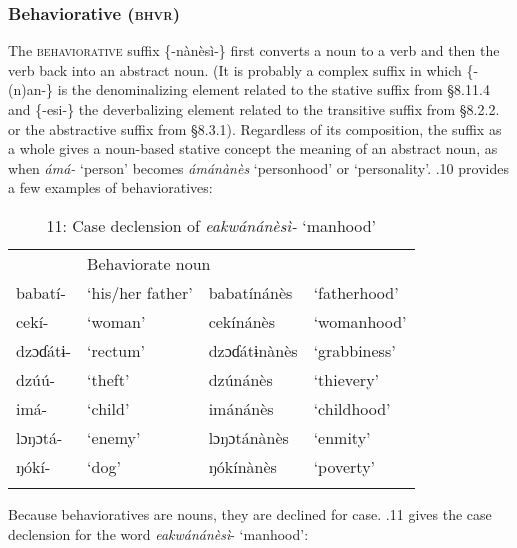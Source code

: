 \begin{table}
\subsubsection{Behaviorative (\textsc{bhvr})}

The \textsc{behaviorative }suffix \{-nànèsì-\} first converts a noun to a verb and then the verb back into an abstract noun. (It is probably a complex suffix in which \{-(n)an-\} is the denominalizing element related to the stative suffix from §8.11.4 and \{-esi-\} the deverbalizing element related to the transitive suffix from §8.2.2. or the abstractive suffix from §8.3.1). Regardless of its composition, the suffix as a whole gives a noun-based stative concept the meaning of an abstract noun, as when \textit{ámá- }‘person’ becomes \textit{ámánànès }‘personhood’ or ‘personality’. .10 provides a few examples of behavioratives:


\begin{table}
\caption{10: Icétôd behaviorative abstract nouns}
\label{tab:8}


\begin{tabularx}{\textwidth}{XXXX}
\lsptoprule

\multicolumn{2}{X}{Noun root} & \multicolumn{2}{X}{Behaviorate noun}\\
babatí- & ‘his/her father’ & babatínánès & ‘fatherhood’\\
cekí- & ‘woman’ & cekínánès & ‘womanhood’\\
dzɔɗátɨ- & ‘rectum’ & dzɔɗátɨnànès & ‘grabbiness’\\
dzúú- & ‘theft’ & dzúnánès & ‘thievery’\\
imá- & ‘child’ & imánánès & ‘childhood’\\
lɔŋɔtá- & ‘enemy’ & lɔŋɔtánànès & ‘enmity’\\
ŋókí- & ‘dog’ & ŋókínànès & ‘poverty’\\
\lspbottomrule
\end{tabularx}
\end{table}
Because behavioratives are nouns, they are declined for case. .11 gives the case declension for the word \textit{eakwánánèsì}{}- ‘manhood’:


\begin{table}
\caption{11: Case declension of \textit{eakwánánèsì- }‘manhood’}
\label{tab:8}



\end{table}
\end{table}
